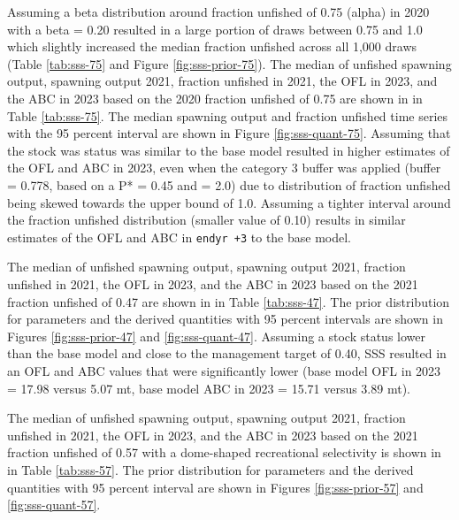 \documentclass[11pt,
  english,
  a4paper,
]{article}
\begin{document}
Assuming a beta distribution around fraction unfished of 0.75 (alpha) in 2020 with a beta = 0.20 resulted in a large portion of draws between 0.75 and 1.0 which slightly increased the median fraction unfished across all 1,000 draws (Table \ref{tab:sss-75} and Figure \ref{fig:sss-prior-75}). The median of unfished spawning output, spawning output 2021, fraction unfished in 2021, the OFL in 2023, and the ABC in 2023 based on the 2020 fraction unfished of 0.75 are shown in in Table \ref{tab:sss-75}. The median spawning output and fraction unfished time series with the 95 percent interval are shown in Figure \ref{fig:sss-quant-75}. Assuming that the stock was status was similar to the base model resulted in higher estimates of the OFL and ABC in 2023, even when the category 3 buffer was applied (buffer = 0.778, based on a P* = 0.45 and \sigma = 2.0) due to distribution of fraction unfished being skewed towards the upper bound of 1.0. Assuming a tighter interval around the fraction unfished distribution (smaller \beta value of 0.10) results in similar estimates of the OFL and ABC in \texttt{endyr\ +3} to the base model.

\leavevmode\tagmcend\tagstructend\par


The median of unfished spawning output, spawning output 2021, fraction unfished in 2021, the OFL in 2023, and the ABC in 2023 based on the 2021 fraction unfished of 0.47 are shown in in Table \ref{tab:sss-47}. The prior distribution for parameters and the derived quantities with 95 percent intervals are shown in Figures \ref{fig:sss-prior-47} and \ref{fig:sss-quant-47}. Assuming a stock status lower than the base model and close to the management target of 0.40, SSS resulted in an OFL and ABC values that were significantly lower (base model OFL in 2023 = 17.98 versus 5.07 mt, base model ABC in 2023 = 15.71 versus 3.89 mt).

\leavevmode\tagmcend\tagstructend\par


The median of unfished spawning output, spawning output 2021, fraction unfished in 2021, the OFL in 2023, and the ABC in 2023 based on the 2021 fraction unfished of 0.57 with a dome-shaped recreational selectivity is shown in in Table \ref{tab:sss-57}. The prior distribution for parameters and the derived quantities with 95 percent interval are shown in Figures \ref{fig:sss-prior-57} and \ref{fig:sss-quant-57}.
\end{document}
